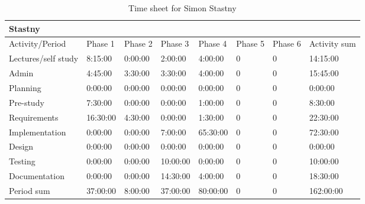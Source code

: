\documentclass[11pt]{book}
\begin{document}
\begin{table}[H]
\centering
\begin{tabular}{| l | l | l | l | l | l | l | l |}
    \hline
    Stastny             &             &             &             &             &             &             &                 \\ \hline          
    Activity/Period     & Phase 1     & Phase 2     & Phase  3    & Phase 4     & Phase 5     & Phase 6     & Activity sum    \\ \hline
    Lectures/self study & 8:15:00     & 0:00:00     & 2:00:00     & 4:00:00     & 0           & 0           & 14:15:00        \\ \hline
    Admin               & 4:45:00     & 3:30:00     & 3:30:00     & 4:00:00     & 0           & 0           & 15:45:00        \\ \hline
    Planning            & 0:00:00     & 0:00:00     & 0:00:00     & 0:00:00     & 0           & 0           & 0:00:00         \\ \hline
    Pre-study           & 7:30:00     & 0:00:00     & 0:00:00     & 1:00:00     & 0           & 0           & 8:30:00         \\ \hline
    Requirements        & 16:30:00    & 4:30:00     & 0:00:00     & 1:30:00     & 0           & 0           & 22:30:00        \\ \hline
    Implementation      & 0:00:00     & 0:00:00     & 7:00:00     & 65:30:00    & 0           & 0           & 72:30:00        \\ \hline
    Design              & 0:00:00     & 0:00:00     & 0:00:00     & 0:00:00     & 0           & 0           & 0:00:00         \\ \hline
    Testing             & 0:00:00     & 0:00:00     & 10:00:00    & 0:00:00     & 0           & 0           & 10:00:00        \\ \hline
    Documentation       & 0:00:00     & 0:00:00     & 14:30:00    & 4:00:00     & 0           & 0           & 18:30:00        \\ \hline
    Period sum          & 37:00:00    & 8:00:00     & 37:00:00    & 80:00:00    & 0           & 0           & 162:00:00       \\ \hline
\end{tabular}
\label{tab:appendix_timesheets_simon}
\caption{Time sheet for Simon Stastny}
\end{table}
\end{document}

